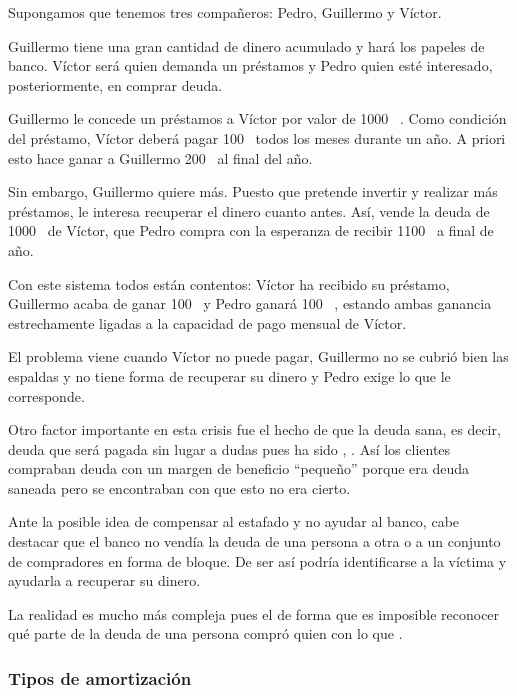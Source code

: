 \documentclass[nochap,palatino,shortheader]{apuntes}
\begin{document}
\begin{example}
Supongamos que tenemos tres compañeros: Pedro, Guillermo y Víctor.

Guillermo tiene una gran cantidad de dinero acumulado y hará los papeles de banco. Víctor será quien demanda un préstamos y Pedro quien esté interesado, posteriormente, en comprar deuda.

Guillermo le concede un préstamos a Víctor por valor de 1000 \texteuro\ . Como condición del préstamo, Víctor deberá pagar 100 \texteuro\  todos los meses durante un año. A priori esto hace ganar a Guillermo 200 \texteuro\  al final del año.

Sin embargo, Guillermo quiere más. Puesto que pretende invertir y realizar más préstamos, le interesa recuperar el dinero cuanto antes. Así, vende la deuda de 1000 \texteuro\  de Víctor, que Pedro compra con la esperanza de recibir 1100 \texteuro\  a final de año.

Con este sistema todos están contentos: Víctor ha recibido su préstamo, Guillermo acaba de ganar 100 \texteuro\  y Pedro ganará 100 \texteuro\ , estando ambas ganancia estrechamente ligadas a la capacidad de pago mensual de Víctor.

El problema viene cuando Víctor no puede pagar, Guillermo no se cubrió bien las espaldas y no tiene forma de recuperar su dinero y Pedro exige lo que le corresponde.
\end{example}

Otro factor importante en esta crisis fue el hecho de que la  deuda sana, es decir, deuda que será pagada sin lugar a dudas pues ha sido , .
Así los clientes compraban deuda con un margen de beneficio ``pequeño'' porque era deuda saneada pero se encontraban con que esto no era cierto.

Ante la posible idea de compensar al estafado y no ayudar al banco, cabe destacar que el banco no vendía la deuda de una persona a otra o a un conjunto de compradores en forma de bloque. De ser así podría identificarse a la víctima y ayudarla a recuperar su dinero.

La realidad es mucho más compleja pues el  de forma que es imposible reconocer qué parte de la deuda de una persona compró quien con lo que .

\subsubsection{Tipos de amortización}
\end{document}
